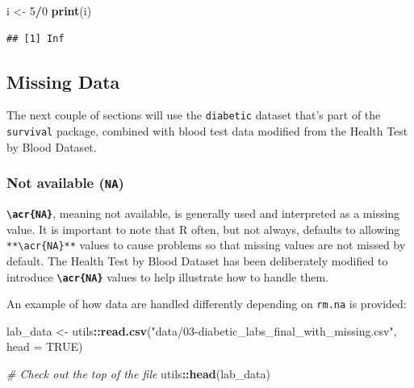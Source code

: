 \documentclass[
]{book}
\newenvironment{Shaded}{\begin{snugshade}}{\end{snugshade}}
\newcommand{\AttributeTok}[1]{\textcolor[rgb]{0.13,0.29,0.53}{#1}}
\newcommand{\CommentTok}[1]{\textcolor[rgb]{0.56,0.35,0.01}{\textit{#1}}}
\newcommand{\ConstantTok}[1]{\textcolor[rgb]{0.56,0.35,0.01}{#1}}
\newcommand{\DecValTok}[1]{\textcolor[rgb]{0.00,0.00,0.81}{#1}}
\newcommand{\FunctionTok}[1]{\textcolor[rgb]{0.13,0.29,0.53}{\textbf{#1}}}
\newcommand{\NormalTok}[1]{#1}
\newcommand{\OtherTok}[1]{\textcolor[rgb]{0.56,0.35,0.01}{#1}}
\newcommand{\SpecialCharTok}[1]{\textcolor[rgb]{0.81,0.36,0.00}{\textbf{#1}}}
\newcommand{\StringTok}[1]{\textcolor[rgb]{0.31,0.60,0.02}{#1}}
\begin{document}
\begin{Shaded}
\begin{Highlighting}[]
\NormalTok{i }\OtherTok{\textless{}{-}} \DecValTok{5}\SpecialCharTok{/}\DecValTok{0}
\FunctionTok{print}\NormalTok{(i)}
\end{Highlighting}
\end{Shaded}

\begin{verbatim}
## [1] Inf
\end{verbatim}

\subsection{Missing Data}\label{sec:missingData}

The next couple of sections will use the \texttt{diabetic} dataset that's part of the \texttt{survival} package, combined with blood test data modified from the Health Test by Blood Dataset.

\subsubsection{\texorpdfstring{Not available (\texttt{NA})}{Not available (NA)}}\label{sec:na}

\textbf{\texttt{\textbackslash{}acr\{NA\}}}, meaning not available, is generally used and interpreted as a missing value. It is important to note that R often, but not always, defaults to allowing \texttt{**\textbackslash{}acr\{NA\}**} values to cause problems so that missing values are not missed by default. The Health Test by Blood Dataset has been deliberately modified to introduce \textbf{\texttt{\textbackslash{}acr\{NA\}}} values to help illustrate how to handle them.

An example of how data are handled differently depending on \texttt{rm.na} is provided:

\begin{Shaded}
\begin{Highlighting}[]
\NormalTok{lab\_data }\OtherTok{\textless{}{-}}\NormalTok{ utils}\SpecialCharTok{::}\FunctionTok{read.csv}\NormalTok{(}\StringTok{"data/03{-}diabetic\_labs\_final\_with\_missing.csv"}\NormalTok{, }\AttributeTok{head =} \ConstantTok{TRUE}\NormalTok{)}

\CommentTok{\# Check out the top of the file}
\NormalTok{utils}\SpecialCharTok{::}\FunctionTok{head}\NormalTok{(lab\_data)}
\end{Highlighting}
\end{Shaded}
\end{document}

